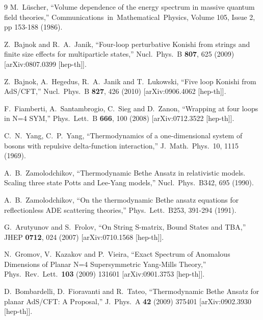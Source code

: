 \documentclass[a4paper,11pt]{article}
\numberwithin{equation}{section}
\begin{document}
\begin{thebibliography} {9}
	M.~L\"{u}scher,
	``Volume dependence of the energy spectrum in massive quantum field theories,''
	Communications\ in\ Mathematical\ Physics, Volume 105, Issue 2, pp 153-188 (1986). 

  Z.~Bajnok and R.~A.~Janik,
  ``Four-loop perturbative Konishi from strings and finite size effects for multiparticle states,''
  Nucl.\ Phys.\ B {\bf 807}, 625 (2009)
  [arXiv:0807.0399 [hep-th]].

  Z.~Bajnok, A.~Hegedus, R.~A.~Janik and T.~Lukowski,
  ``Five loop Konishi from AdS/CFT,''
  Nucl.\ Phys.\ B {\bf 827}, 426 (2010)
  [arXiv:0906.4062 [hep-th]].

  F.~Fiamberti, A.~Santambrogio, C.~Sieg and D.~Zanon,
  ``Wrapping at four loops in N=4 SYM,''
  Phys.\ Lett.\ B {\bf 666}, 100 (2008)
  [arXiv:0712.3522 [hep-th]].

	C.~N.~Yang, C.~P.~Yang, 
	``Thermodynamics of a one-dimensional system of bosons with repulsive delta-function interaction,''
	J.\ Math.\ Phys.\ 10, 1115 (1969).

	A.~B.~Zamolodchikov, 
	``Thermodynamic Bethe Ansatz in relativistic models. Scaling three state Potts and Lee-Yang models,''
	Nucl.\ Phys.\ B342, 695 (1990).

	A.~B.~Zamolodchikov,
	``On the thermodynamic Bethe ansatz equations for reflectionless ADE scattering theories,''
	Phys.\ Lett.\ B253, 391-294 (1991).

  G.~Arutyunov and S.~Frolov,
  ``On String S-matrix, Bound States and TBA,''
  JHEP {\bf 0712}, 024 (2007)
  [arXiv:0710.1568 [hep-th]].

  N.~Gromov, V.~Kazakov and P.~Vieira,
  ``Exact Spectrum of Anomalous Dimensions of Planar N=4 Supersymmetric Yang-Mills Theory,''
  Phys.\ Rev.\ Lett.\  {\bf 103} (2009) 131601
  [arXiv:0901.3753 [hep-th]].

  D.~Bombardelli, D.~Fioravanti and R.~Tateo,
  ``Thermodynamic Bethe Ansatz for planar AdS/CFT: A Proposal,''
  J.\ Phys.\ A {\bf 42} (2009) 375401
  [arXiv:0902.3930 [hep-th]].


\end{thebibliography}
\end{document}
